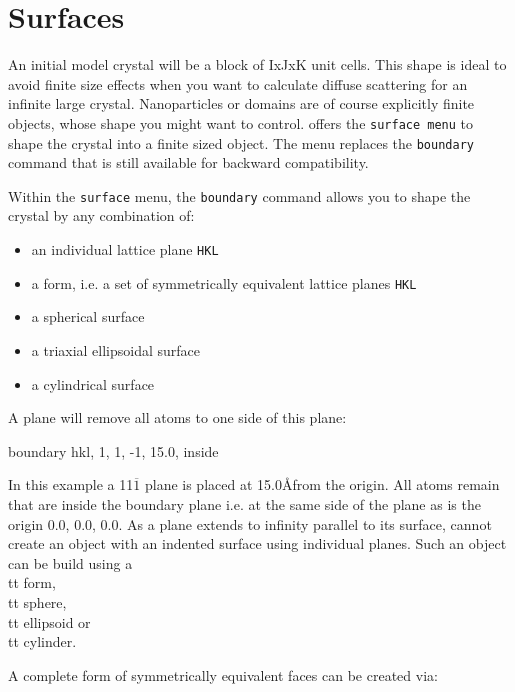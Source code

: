 
\section{Surfaces \label{mod-surface}}

An initial model crystal will be a block of IxJxK unit cells. This shape
is ideal to avoid finite size effects when you want to calculate diffuse
scattering for an infinite large crystal. Nanoparticles or domains are
of course explicitly finite objects, whose shape you might want to 
control. \Discus offers the {\tt surface menu} to shape the crystal into
a finite sized object. The menu replaces the {\tt boundary} command that
is still available for backward compatibility.

Within the {\tt surface} menu, the {\tt boundary} command allows you to
shape the crystal by any combination of:\\
\begin{itemize}
\item an individual lattice plane {\tt HKL}
\item a form, i.e. a set of symmetrically equivalent lattice planes {\tt HKL}
\item a spherical surface
\item a triaxial ellipsoidal surface
\item a cylindrical surface
\end{itemize}

A plane will remove all atoms to one side of this plane:

\begin{MacVerbatim}
boundary hkl, 1, 1, -1, 15.0, inside
\end{MacVerbatim}

In this example a 11$\overline{1}$ plane is placed at 15.0\AA from the 
origin. All
atoms remain that are inside the boundary plane i.e. at the same side 
of the plane as is the origin 0.0, 0.0, 0.0. As a plane extends to 
infinity parallel to its surface, \Discus cannot create an object with
an indented surface using individual planes. 
Such an object can be build using a {\\tt form}, {\\tt sphere}, 
{\\tt ellipsoid} or {\\tt cylinder}.

A complete form of symmetrically equivalent faces can be created via:

